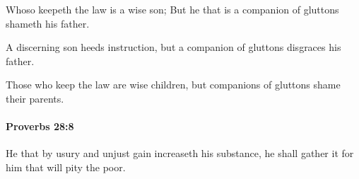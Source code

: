 			\begin{versebox}
					\item[BHS] 
					\item[ASV] Whoso keepeth the law is a wise son; But he that is a companion of gluttons shameth his father.
					\item[NIV] A discerning son heeds instruction, but a companion of gluttons disgraces his father.
					\item[NRSV] Those who keep the law are wise children, but companions of gluttons shame their parents.
			\end{versebox}

		\paragraph{Proverbs 28:8} %
			\label{PROVERBS-28-8}

			He that by usury and unjust gain increaseth his substance, he shall gather it for him that will pity the poor.

